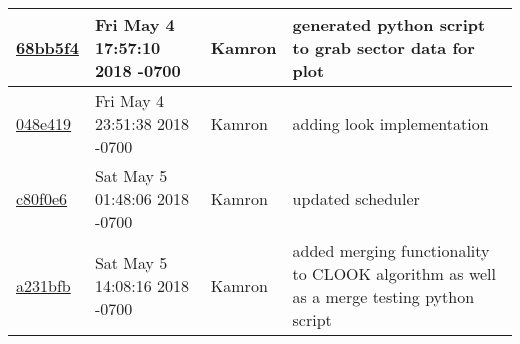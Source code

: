 \begin{tabular}{l l l l}
\href{https://github.com/ebrahimk/CS444/commit/68bb5f47a651687c5de0a882a70d1f35a0064165}{68bb5f4} & Fri May 4 17:57:10 2018 -0700 & Kamron & generated python script to grab sector data for plot\\\hline
\href{https://github.com/ebrahimk/CS444/commit/048e41943ebf06341dcfd826548f5ed68a435277}{048e419} & Fri May 4 23:51:38 2018 -0700 & Kamron & adding look implementation\\\hline
\href{https://github.com/ebrahimk/CS444/commit/c80f0e6bb8a253f2bc8328b9fe55efcfe095da42}{c80f0e6} & Sat May 5 01:48:06 2018 -0700 & Kamron & updated scheduler\\\hline
\href{https://github.com/ebrahimk/CS444/commit/a231bfbe9e4e5321231b75e5e036dccd86509853}{a231bfb} & Sat May 5 14:08:16 2018 -0700 & Kamron & added merging functionality to CLOOK algorithm as well as a merge testing python script\\\hline\end{tabular}
